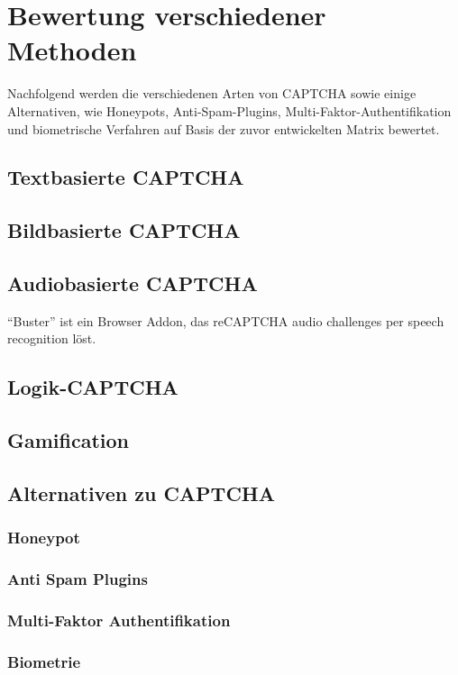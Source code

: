 \chapter{Bewertung verschiedener Methoden}

Nachfolgend werden die verschiedenen Arten von CAPTCHA sowie einige Alternativen, wie Honeypots, Anti-Spam-Plugins, 
Multi-Faktor-Authentifikation und biometrische Verfahren auf Basis der zuvor entwickelten Matrix bewertet. 

\section{Textbasierte CAPTCHA}

\section{Bildbasierte CAPTCHA}

\section{Audiobasierte CAPTCHA}

“Buster” ist ein Browser Addon, das reCAPTCHA audio challenges per speech recognition löst.

\section{Logik-CAPTCHA}

\section{Gamification}

\section{Alternativen zu CAPTCHA}

\subsection{Honeypot}

\subsection{Anti Spam Plugins}

\subsection{Multi-Faktor Authentifikation}

\subsection{Biometrie}